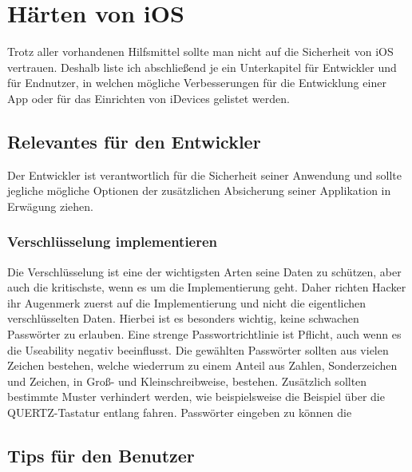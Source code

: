\section{Härten von iOS}
	Trotz aller vorhandenen Hilfsmittel sollte man nicht auf die Sicherheit von iOS
	vertrauen. Deshalb liste ich abschließend je ein Unterkapitel für Entwickler
	und für Endnutzer, in welchen mögliche Verbesserungen für die
	Entwicklung einer App oder für das Einrichten von iDevices gelistet werden.
	\subsection{Relevantes für den Entwickler}
		Der Entwickler ist verantwortlich für die Sicherheit seiner Anwendung und
		sollte jegliche mögliche Optionen der zusätzlichen Absicherung seiner
		Applikation in Erwägung ziehen. 
		\subsubsection{Verschlüsselung implementieren}
			Die Verschlüsselung ist eine der wichtigsten Arten seine Daten zu schützen,
			aber auch die kritischste, wenn es um die Implementierung geht. Daher richten
			Hacker ihr Augenmerk zuerst auf die Implementierung und nicht die
			eigentlichen verschlüsselten Daten. Hierbei ist es besonders wichtig, keine
			schwachen Passwörter zu erlauben. Eine strenge Passwortrichtlinie ist
			Pflicht, auch wenn es die Useability negativ beeinflusst. Die gewählten
			Passwörter sollten aus vielen Zeichen bestehen, welche wiederrum zu einem
			Anteil aus Zahlen, Sonderzeichen und Zeichen, in Groß- und Kleinschreibweise,
			bestehen. Zusätzlich sollten bestimmte Muster verhindert werden, wie
			beispielsweise die  Beispiel über die QUERTZ-Tastatur entlang fahren.
			Passwörter eingeben zu können die
	\subsection{Tips für den Benutzer}
